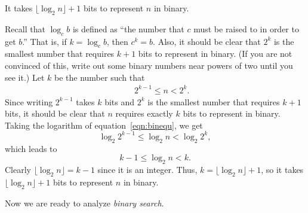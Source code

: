 \begin{thm}\label{thm:numbinarybits}
It takes $\lfloor \log_2 n\rfloor +1$ bits to represent $n$ in binary.
\begin{pf}
Recall that $\log_c b$ is defined as 
``the number that $c$ must be raised to in order to get $b$.'' 
That is, if $k = \log_c b$, then $c^k=b$.  
Also, it should be clear that $2^k$ is the smallest number that requires 
$k+1$ bits to represent in binary. (If you are not convinced of this, write out
some binary numbers near powers of two until you see it.)
Let $k$ be the number such that 
\begin{eqnarray}
\label{eqn:binequ}&& 2^{k-1}\leq n < 2^k.
\end{eqnarray}
Since writing $2^{k-1}$ takes $k$ bits and $2^k$ is the smallest number
that requires $k+1$ bits, it should be clear that 
$n$ requires exactly $k$ bits to represent in binary.  
Taking the logarithm of equation~\ref{eqn:binequ}, we get 
$$\log_2 2^{k-1}\leq \log_2 n < \log_2 2^k,$$ 
which leads to  
$$k-1\leq \log_2 n < k.$$
Clearly $\lfloor \log_2 n\rfloor =k-1$ since it is an integer.
Thus, 
$k=\lfloor \log_2 n\rfloor+1$, so it
takes $\lfloor \log_2 n\rfloor +1$ bits to represent $n$ in binary.
\end{pf}
\end{thm}

Now we are ready to analyze {\em binary search}.

